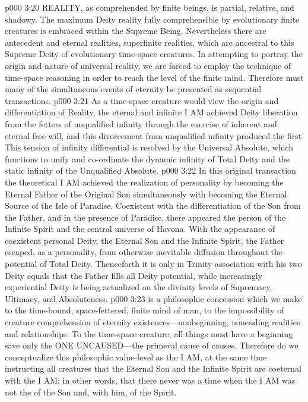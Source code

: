 \pc \vs p000 3:20 REALITY, as comprehended by finite beings, is partial, relative, and shadowy. The maximum Deity reality fully comprehensible by evolutionary finite creatures is embraced within the Supreme Being. Nevertheless there are antecedent and eternal realities, superfinite realities, which are ancestral to this Supreme Deity of evolutionary time\hyp{}space creatures. In attempting to portray the origin and nature of universal reality, we are forced to employ the technique of time\hyp{}space reasoning in order to reach the level of the finite mind. Therefore must many of the simultaneous events of eternity be presented as sequential transactions.
\vs p000 3:21 As a time\hyp{}space creature would view the origin and differentiation of Reality, the eternal and infinite I AM achieved Deity liberation from the fetters of unqualified infinity through the exercise of inherent and eternal free will, and this divorcement from unqualified infinity produced the first  This tension of infinity differential is resolved by the Universal Absolute, which functions to unify and co\hyp{}ordinate the dynamic infinity of Total Deity and the static infinity of the Unqualified Absolute.
\vs p000 3:22 In this original transaction the theoretical I AM achieved the realization of personality by becoming the Eternal Father of the Original Son simultaneously with becoming the Eternal Source of the Isle of Paradise. Coexistent with the differentiation of the Son from the Father, and in the presence of Paradise, there appeared the person of the Infinite Spirit and the central universe of Havona. With the appearance of coexistent personal Deity, the Eternal Son and the Infinite Spirit, the Father escaped, as a personality, from otherwise inevitable diffusion throughout the potential of Total Deity. Thenceforth it is only in Trinity association with his two Deity equals that the Father fills all Deity potential, while increasingly experiential Deity is being actualized on the divinity levels of Supremacy, Ultimacy, and Absoluteness.
\pc \vs p000 3:23  is a philosophic concession which we make to the time\hyp{}bound, space\hyp{}fettered, finite mind of man, to the impossibility of creature comprehension of eternity existences---non\-be\-gin\-ning, nonending realities and relationships. To the time\hyp{}space creature, all things must have a beginning save only the ONE UNCAUSED---the primeval cause of causes. Therefore do we conceptualize this philosophic value\hyp{}level as the I AM, at the same time instructing all creatures that the Eternal Son and the Infinite Spirit are coeternal with the I AM; in other words, that there never was a time when the I AM was not the  of the Son and, with him, of the Spirit.
